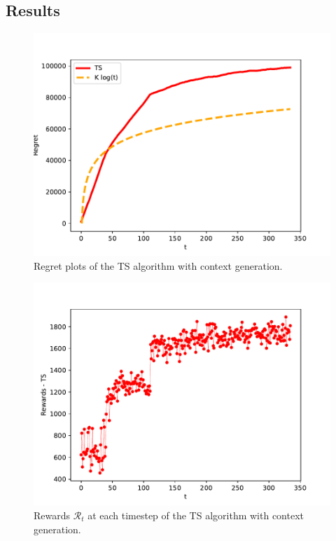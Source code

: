 \documentclass[12pt,a4paper]{report}
\begin{document}
			\subsection{Results}
\begin{figure}[H]
\centering
  \includegraphics[scale = 0.7, center]{7r}
  \caption{Regret plots of the TS algorithm with context generation.}
\end{figure}
\begin{figure}[H]
\centering
  \includegraphics[scale = 0.7, center]{7rew}
  \caption{Rewards $\mathcal R_t$ at each timestep of the TS algorithm with context generation.}
\end{figure}
\end{document}
